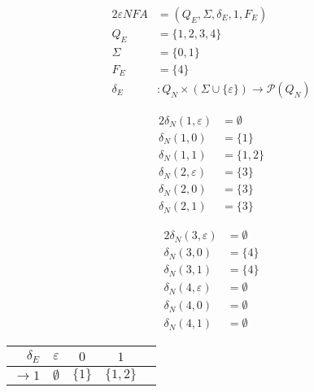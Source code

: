 \documentclass[docid=PA04]{tcom_PA}
\begin{document}
\setcounter{chapter}{3}
{
\renewcommand{\thesubsection}{\thesection.\alph{subsection}}
\begin{center}
\begin{minipage}[c]{0.35\textwidth}
	\begin{alignat*}{2}
		\varepsilon NFA    &= (Q_E, \Sigma, \delta_E, 1, F_E)\\
		Q_E    &= \{1,2,3,4\}\\
		\Sigma &= \{0,1\}\\
		F_E    &= \{4\}\\
		\delta_E &\colon Q_N \times (\Sigma\cup \{\varepsilon\}) \rightarrow \mathscr{P}(Q_N)
	\end{alignat*}
\end{minipage}%
\begin{minipage}[c]{0.25\textwidth}
	\begin{alignat*}{2}
		\delta_N(1,\varepsilon) &= \emptyset\\
		\delta_N(1,          0) &= \{1\}\\
		\delta_N(1,          1) &= \{1,2\}\\
		\delta_N(2,\varepsilon) &= \{3\}\\
		\delta_N(2,          0) &= \{3\}\\
		\delta_N(2,          1) &= \{3\}
	\end{alignat*}
\end{minipage}%
\begin{minipage}[c]{0.25\textwidth}
	\begin{alignat*}{2}
		\delta_N(3,\varepsilon) &= \emptyset\\
		\delta_N(3,          0) &= \{4\}\\
		\delta_N(3,          1) &= \{4\}\\
		\delta_N(4,\varepsilon) &= \emptyset\\
		\delta_N(4,          0) &= \emptyset\\
		\delta_N(4,          1) &= \emptyset
	\end{alignat*}
\end{minipage}
\end{center}
\begin{center}
\begin{tabular}{r | c c c c}
	$     \delta_E$ & $\varepsilon$ & $0        $ & $1        $ \\ \hline
	$\rightarrow 1$ & $\emptyset  $ & $\{1\}    $ & $\{1,2\}  $ \\

\end{tabular}
\end{center}}
\end{document}
